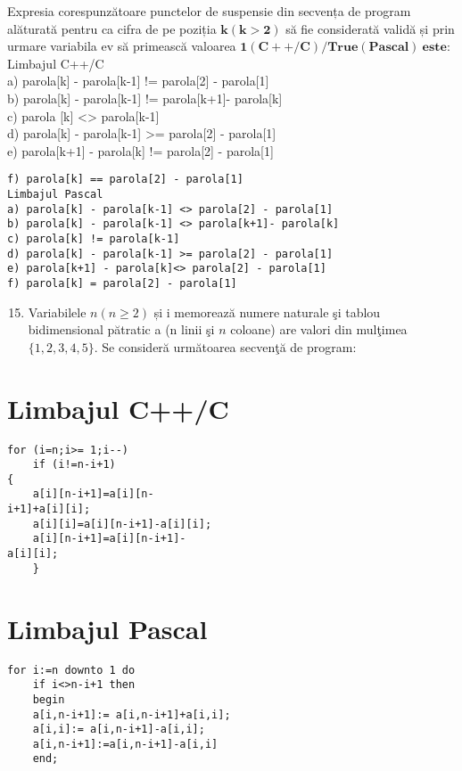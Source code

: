 Expresia corespunzătoare punctelor de suspensie din secvența de program alăturată pentru ca cifra de pe poziția $\mathbf{k}(\mathbf{k}>\mathbf{2})$ să fie considerată validă și prin urmare variabila ev să primească valoarea $\mathbf{1 ( C + + / C ) / T r u e ( P a s c a l ) ~ e s t e : ~}$\\
Limbajul C++/C\\[0pt]
a) parola[k] - parola[k-1] != parola[2] - parola[1]\\[0pt]
b) parola[k] - parola[k-1] != parola[k+1]- parola[k]\\[0pt]
c) parola [k] <> parola[k-1]\\[0pt]
d) parola[k] - parola[k-1] >= parola[2] - parola[1]\\[0pt]
e) parola[k+1] - parola[k] != parola[2] - parola[1]

\begin{verbatim}
f) parola[k] == parola[2] - parola[1]
Limbajul Pascal
a) parola[k] - parola[k-1] <> parola[2] - parola[1]
b) parola[k] - parola[k-1] <> parola[k+1]- parola[k]
c) parola[k] != parola[k-1]
d) parola[k] - parola[k-1] >= parola[2] - parola[1]
e) parola[k+1] - parola[k]<> parola[2] - parola[1]
f) parola[k] = parola[2] - parola[1]
\end{verbatim}

\begin{enumerate}
  \setcounter{enumi}{14}
  \item Variabilele $n(n \geq 2)$ și i memorează numere naturale şi tablou bidimensional pătratic a (n linii şi $n$ coloane) are valori din mulţimea $\{1,2,3,4,5\}$. Se consideră următoarea secvenţă de program:
\end{enumerate}

\section*{Limbajul C++/C}
\begin{verbatim}
for (i=n;i>= 1;i--)
    if (i!=n-i+1)
{
    a[i][n-i+1]=a[i][n-
i+1]+a[i][i];
    a[i][i]=a[i][n-i+1]-a[i][i];
    a[i][n-i+1]=a[i][n-i+1]-
a[i][i];
    }
\end{verbatim}

\section*{Limbajul Pascal}
\begin{verbatim}
for i:=n downto 1 do
    if i<>n-i+1 then
    begin
    a[i,n-i+1]:= a[i,n-i+1]+a[i,i];
    a[i,i]:= a[i,n-i+1]-a[i,i];
    a[i,n-i+1]:=a[i,n-i+1]-a[i,i]
    end;
\end{verbatim}

